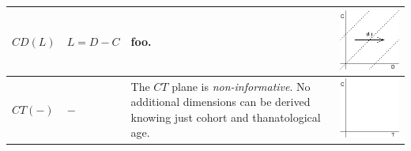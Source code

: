 \documentclass[
  12pt
]{scrartcl}
\begin{document}
\begin{center}
\begin{longtable}{m{}m{}m{}m{}}
  \midrule
  $CD(L)$ & $L = D - C$ &
  foo. &
  \includegraphics[width = \linewidth]{../fig/CDl.pdf} \\
  \midrule
  $CT(-)$ & $-$ &
  The $CT$ plane is \emph{non-informative}. No additional dimensions can be derived knowing just cohort and thanatological age. &
  \includegraphics[width = \linewidth]{../fig/CT.pdf} \\

\end{longtable}
\end{center}
\end{document}
